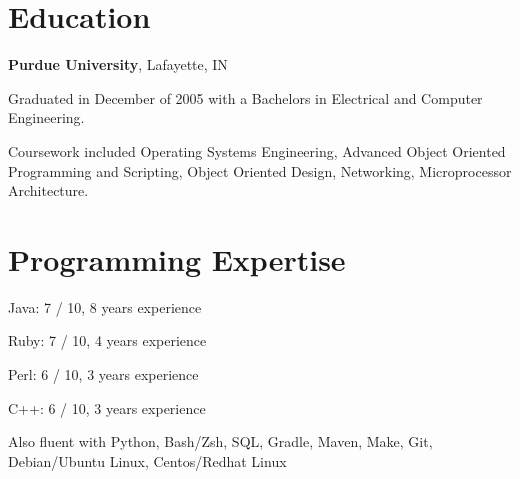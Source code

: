 \documentclass[margin,line]{resume}
\begin{document}
\begin{resume}
	\section{\mysidestyle Education}

	{\bf Purdue University}, Lafayette, IN \vspace{2mm}
	\begin{list2}
		\vspace*{1mm}
	\item
		Graduated in December of 2005 with a Bachelors in Electrical and
		Computer Engineering.
	\item
		Coursework included Operating Systems Engineering, Advanced Object Oriented
		Programming and Scripting, Object Oriented Design, Networking, Microprocessor
		Architecture.
	\end{list2}


	\section{\mysidestyle Programming Expertise} 
	\begin{list2}
	\item 
		Java: 7 / 10, 8 years experience
	\item 
		Ruby: 7 / 10, 4 years experience
	\item
		Perl: 6 / 10, 3 years experience
	\item
		C++: 6 / 10, 3 years experience
	\item
		Also fluent with Python, Bash/Zsh, SQL, Gradle, Maven, Make, Git, Debian/Ubuntu Linux, Centos/Redhat Linux
	\end{list2}


\end{resume}
\end{document}

